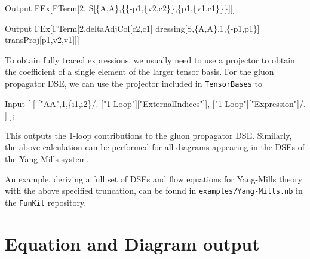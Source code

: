 \documentclass[10pt,prd,nofootinbib,superscriptaddress,twocolumn]{revtex4-2}
\newcommand{\FunKit}{\texttt{FunKit}\xspace}
\newcommand{\TensorBases}{\texttt{TensorBases}\xspace}
\begin{document}
%
\begin{mmaCell}{Output}
 FEx[FTerm[2,
   S[\{A,A\},\{\{-p1,\{v2,c2\}\},\{p1,\{v1,c1\}\}\}]]]
\end{mmaCell}
%
\begin{mmaCell}{Output}
 FEx[FTerm[2,deltaAdjCol[c2,c1]
   dressing[S,\{A,A\},1,\{-p1,p1\}]
   transProj[p1,v2,v1]]]
\end{mmaCell}
%
To obtain fully traced expressions, we usually need to use a projector to obtain the coefficient of a single element of the larger tensor basis. For the gluon propagator DSE, we can use the projector included in \TensorBases to 
%
\begin{mmaCell}{Input}
 [
   [
     ["AA",1,\{i1,i2\}/.
       ["1-Loop"]["ExternalIndices"]], ["1-Loop"]["Expression"]/.
   ]
 ];
\end{mmaCell}
%
This outputs the 1-loop contributions to the gluon propagator DSE. Similarly, the above calculation can be performed for all diagrams appearing in the DSEs of the Yang-Mills system.

An example, deriving a full set of DSEs and flow equations for Yang-Mills theory with the above specified truncation, can be found in \texttt{examples/Yang-Mills.nb} in the \FunKit repository.


\section{Equation and Diagram output}
\label{sec:DiANE}
\end{document}
